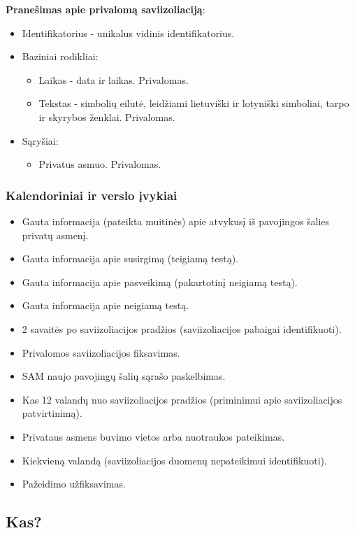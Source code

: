 \documentclass{VUMIFPSkursinis}
\begin{document}
\noindent\textbf{Pranešimas apie privalomą saviizoliaciją}:
\begin{itemize}
	\item Identifikatorius - unikalus vidinis identifikatorius.
	\item Baziniai rodikliai:
	\begin{itemize}
		\item Laikas - data ir laikas. Privalomas.
		\item Tekstas - simbolių eilutė, leidžiami lietuviški ir lotyniški simboliai, tarpo ir skyrybos ženklai. Privalomas.
	\end{itemize}
	\item Sąryšiai:
	\begin{itemize}
		\item Privatus asmuo. Privalomas.
	\end{itemize}	
\end{itemize}

\subsubsection{Kalendoriniai ir verslo įvykiai}

\begin{itemize}
	\item Gauta informacija (pateikta muitinės) apie atvykusį iš pavojingos šalies privatų asmenį.
	\item Gauta informacija apie susirgimą (teigiamą testą).
	\item Gauta informacija apie pasveikimą (pakartotinį neigiamą testą).
	\item Gauta informacija apie neigiamą testą.
	\item 2 savaitės po saviizoliacijos pradžios (saviizoliacijos pabaigai identifikuoti).
	\item Privalomos saviizoliacijos fiksavimas.
	\item SAM naujo pavojingų šalių sąrašo paskelbimas.
	\item Kas 12 valandų nuo saviizoliacijos pradžios (priminimui apie saviizoliacijos patvirtinimą).
	\item Privataus asmens buvimo vietos arba nuotraukos pateikimas.
	\item Kiekvieną valandą (saviizoliacijos duomenų nepateikimui identifikuoti).
	\item Pažeidimo užfiksavimas.
\end{itemize}

\subsection{Kas?}\label{sec:vartotojoReqWho}
\end{document}
